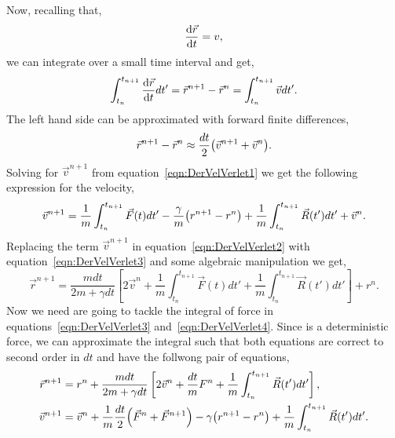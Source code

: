 Now, recalling that,
\begin{gather}
    \dv{\vec{r}}{t} = v,
\end{gather}
we can integrate over a small time interval and get,
\begin{gather}
    \int_{t_n}^{t_{n+1}}\dv{\vec{r}}{t} dt' = \vec{r}^{n+1}-\vec{r}^{n} = \int_{t_n}^{t_{n+1}}\vec{v} dt'.
\end{gather}
The left hand side can be approximated with forward finite differences,
\begin{gather}
    \vec{r}^{n+1}-\vec{r}^{n} \approx \frac{dt}{2}\qty(\vec{v}^{n+1} + \vec{v}^n)\label{eqn:DerVelVerlet2}.
\end{gather}
Solving for $\vec{v}^{n+1}$ from equation~\eqref{eqn:DerVelVerlet1} we get the following expression for the velocity,
\begin{gather}
    \vec{v}^{n+1} = \frac{1}{m}\int_{t_n}^{t_{n+1}}\vec{F}(t)dt'
                     -\frac{\gamma}{m}\qty(r^{n+1}-r^n)
                     +\frac{1}{m}\int_{t_n}^{t_{n+1}}\vec{R}(t')dt'
                     +\vec{v}^{n}\label{eqn:DerVelVerlet3}.
\end{gather}
Replacing the term $\vec{v}^{n+1}$ in equation~\eqref{eqn:DerVelVerlet2} with equation~\eqref{eqn:DerVelVerlet3} and some algebraic manipulation we get,
\begin{equation}
    \vec{r}^{n+1} = \frac{m dt}{2m +\gamma dt}\left[ 
                        2\vec{v}^{n}                
                        +\frac{1}{m}\int_{t_n}^{t_{n+1}}\vec{F}(t)dt'
                        +\frac{1}{m}\int_{t_n}^{t_{n+1}}\vec{R}(t')dt'
                    \right]
                    +r^n\label{eqn:DerVelVerlet4}.
\end{equation}
Now we need are going to tackle the integral of force in equations~\eqref{eqn:DerVelVerlet3} and~\eqref{eqn:DerVelVerlet4}.
Since is a deterministic force, we can approximate the integral such that both equations are correct to second order in $dt$ and have the follwong pair of equations,
\begin{align}
    \vec{r}^{n+1} &= r^n
                    +\frac{m dt}{2m +\gamma dt}\left[ 
                        2\vec{v}^{n}                
                        +\frac{dt}{m}F^{n}
                        +\frac{1}{m}\int_{t_n}^{t_{n+1}}\vec{R}(t')dt'
                    \right]\label{eqn:DerVelVerlet5}
                    , \\
    \vec{v}^{n+1} &= \vec{v}^{n}
                     +\frac{1}{m}\frac{dt}{2}\qty(\vec{F}^{n} + \vec{F}^{n+1})
                     -\gamma\qty(r^{n+1}-r^n)
                     +\frac{1}{m}\int_{t_n}^{t_{n+1}}\vec{R}(t')dt'\label{eqn:DerVelVerlet6}.
\end{align}
